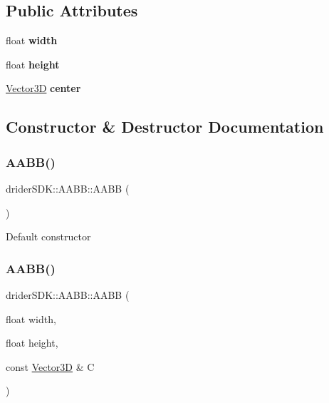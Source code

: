 \subsection*{Public Attributes}
\begin{DoxyCompactItemize}
\item 
\mbox{\label{classdrider_s_d_k_1_1_a_a_b_b_a98cfba128f7bd0c9b22db7c5c8b6da91}} 
float {\bfseries width}
\item 
\mbox{\label{classdrider_s_d_k_1_1_a_a_b_b_aa65615a475c87e4fbe798a6b566c265a}} 
float {\bfseries height}
\item 
\mbox{\label{classdrider_s_d_k_1_1_a_a_b_b_a164532986088aef90b04583ba3338d9b}} 
\hyperlink{classdrider_s_d_k_1_1_vector3_d}{Vector3D} {\bfseries center}
\end{DoxyCompactItemize}


\subsection{Constructor \& Destructor Documentation}
\mbox{\label{classdrider_s_d_k_1_1_a_a_b_b_a290a97c9263d9216f3730c331b24af23}} 
\subsubsection{\texorpdfstring{A\+A\+B\+B()}{AABB()}\hspace{0.1cm}{\footnotesize\ttfamily [1/4]}}
{\footnotesize\ttfamily drider\+S\+D\+K\+::\+A\+A\+B\+B\+::\+A\+A\+BB (\begin{DoxyParamCaption}{ }\end{DoxyParamCaption})}

Default constructor \mbox{\label{classdrider_s_d_k_1_1_a_a_b_b_a01d474019eb0b1335969de2e36f93fc3}} 
\subsubsection{\texorpdfstring{A\+A\+B\+B()}{AABB()}\hspace{0.1cm}{\footnotesize\ttfamily [2/4]}}
{\footnotesize\ttfamily drider\+S\+D\+K\+::\+A\+A\+B\+B\+::\+A\+A\+BB (\begin{DoxyParamCaption}\item[{float}]{width,  }\item[{float}]{height,  }\item[{const \hyperlink{classdrider_s_d_k_1_1_vector3_d}{Vector3D} \&}]{C }\end{DoxyParamCaption})}


